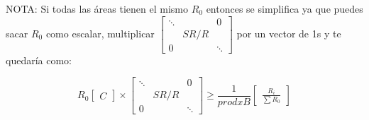 \documentclass[12pt, oneside, a4paper]{article}
\begin{document}
NOTA: Si todas las áreas tienen el mismo $R_{0}$ entonces se simplifica ya que puedes sacar $R_{0}$ como escalar, multiplicar $\begin{bmatrix} \ddots& & 0 \\ & SR/R & \\ 0 & & \ddots\end{bmatrix}$ por un vector de 1s y te quedaría como:

\begin{equation}
    R_{0} \begin{bmatrix} C \end{bmatrix} \times \begin{bmatrix} \ddots & & 0 \\ & SR/R & \\ 0 & & \ddots\end{bmatrix} \geq \frac{1}{prodxB} \begin{bmatrix} \frac{R_{i}}{\sum R_{0}} \end{bmatrix}
\end{equation}
\end{document}
